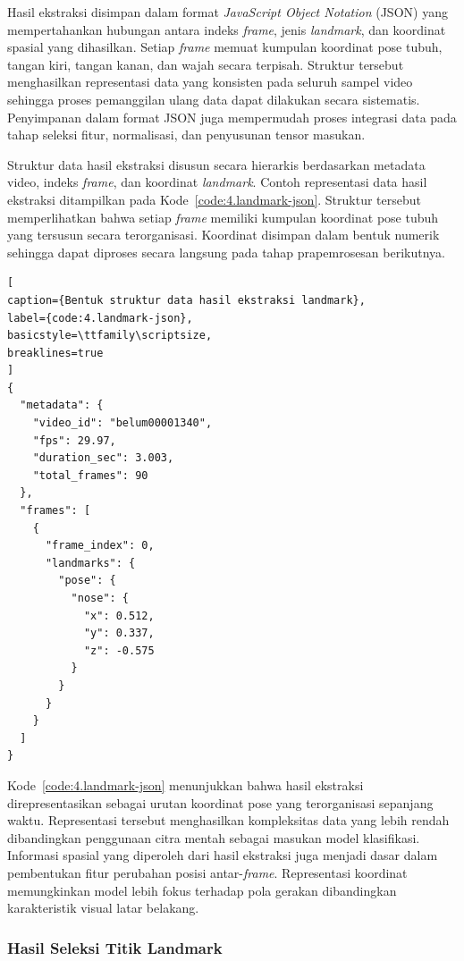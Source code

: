 Hasil ekstraksi disimpan dalam format \textit{JavaScript Object Notation} (JSON) yang mempertahankan hubungan antara indeks \textit{frame}, jenis \textit{landmark}, dan koordinat spasial yang dihasilkan. 
Setiap \textit{frame} memuat kumpulan koordinat pose tubuh, tangan kiri, tangan kanan, dan wajah secara terpisah. 
Struktur tersebut menghasilkan representasi data yang konsisten pada seluruh sampel video sehingga proses pemanggilan ulang data dapat dilakukan secara sistematis. 
Penyimpanan dalam format JSON juga mempermudah proses integrasi data pada tahap seleksi fitur, normalisasi, dan penyusunan tensor masukan.

Struktur data hasil ekstraksi disusun secara hierarkis berdasarkan metadata video, indeks \textit{frame}, dan koordinat \textit{landmark}. 
Contoh representasi data hasil ekstraksi ditampilkan pada Kode~\ref{code:4.landmark-json}. 
Struktur tersebut memperlihatkan bahwa setiap \textit{frame} memiliki kumpulan koordinat pose tubuh yang tersusun secara terorganisasi. 
Koordinat disimpan dalam bentuk numerik sehingga dapat diproses secara langsung pada tahap prapemrosesan berikutnya.

\begin{lstlisting}[
caption={Bentuk struktur data hasil ekstraksi landmark},
label={code:4.landmark-json},
basicstyle=\ttfamily\scriptsize,
breaklines=true
]
{
  "metadata": {
    "video_id": "belum00001340",
    "fps": 29.97,
    "duration_sec": 3.003,
    "total_frames": 90
  },
  "frames": [
    {
      "frame_index": 0,
      "landmarks": {
        "pose": {
          "nose": {
            "x": 0.512,
            "y": 0.337,
            "z": -0.575
          }
        }
      }
    }
  ]
}
\end{lstlisting}

Kode~\ref{code:4.landmark-json} menunjukkan bahwa hasil ekstraksi direpresentasikan sebagai urutan koordinat pose yang terorganisasi sepanjang waktu. 
Representasi tersebut menghasilkan kompleksitas data yang lebih rendah dibandingkan penggunaan citra mentah sebagai masukan model klasifikasi. 
Informasi spasial yang diperoleh dari hasil ekstraksi juga menjadi dasar dalam pembentukan fitur perubahan posisi antar-\textit{frame}. 
Representasi koordinat memungkinkan model lebih fokus terhadap pola gerakan dibandingkan karakteristik visual latar belakang.

\subsubsection{Hasil Seleksi Titik Landmark}
\label{subsubsec:hasil-seleksi}

